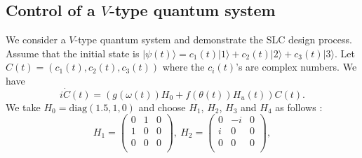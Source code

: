 \documentclass[letterpaper, 10 pt, conference]{ieeeconf}
\begin{document}
\subsection{Control of a $V$-type quantum system}
We consider a $V$-type quantum system and
demonstrate the SLC design process. Assume that the initial state is
$|\psi(t)\rangle=c_{1}(t)|1\rangle+c_{2}(t)|2\rangle+c_{3}(t)|3\rangle$.
Let $C(t)=(c_{1}(t),c_{2}(t),c_{3}(t))$ where the $c_i(t)$'s are complex numbers. We have
\begin{equation}
i\dot{C}(t)=(g(\omega(t))H_{0}+f(\theta(t))H_{u}(t))C(t).
\end{equation}
We take $H_{0}=\textrm{diag}(1.5, 1, 0)$ and choose $H_{1}$, $H_{2}$,
$H_{3}$ and $H_{4}$ as follows \cite{Hou et al 2012}:
\begin{equation}\label{h0}
H_{1}=
\left(\begin{array}{ccc}
  0 & 1 & 0 \\
  1 & 0  & 0 \\
  0 & 0  & 0 \\
\end{array}\right), \ H_{2}=
\left(\begin{array}{ccc}
  0 & -i & 0 \\
  i & 0  & 0 \\
  0 & 0  & 0 \\
\end{array}\right), \nonumber \end{equation}
\end{document}
